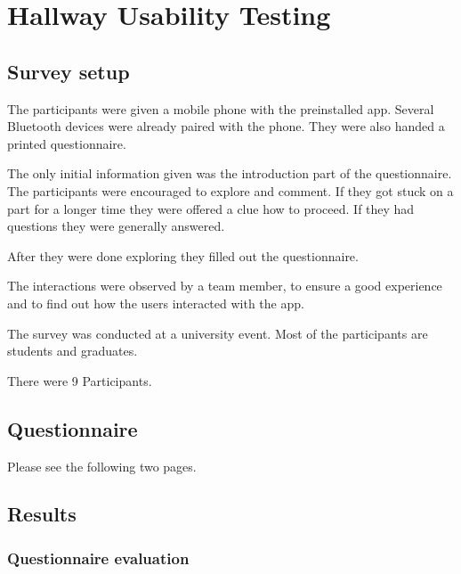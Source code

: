 \chapter{Hallway Usability Testing}

\section{Survey setup}
\begin{flushleft}


The participants were given a mobile phone with the preinstalled app. Several Bluetooth devices were already paired with the phone. They were also handed a printed questionnaire.

The only initial information given was the introduction part of the questionnaire. The participants were encouraged to explore and comment. If they got stuck on a part for a longer time they were offered a clue how to proceed. If they had questions they were generally answered.

After they were done exploring they filled out the questionnaire.

The interactions were observed by a team member, to ensure a good experience and to find out how the users interacted with the app.

The survey was conducted at a university event. Most of the participants are students and graduates.

There were 9 Participants.

\section{Questionnaire}
Please see the following two pages.
\newpage

\section{Results}
\subsection{Questionnaire evaluation}


\end{flushleft}

